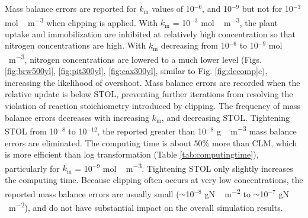 \documentclass[gmd, manuscript]{copernicus}
\begin{document}
Mass balance errors are reported for $k_\text{m}$ values of 10$^{-6}$, and
10$^{-9}$ but not for 10$^{-3}$ \unit{mol\,m^{-3}} when clipping is applied.
With $k_\text{m}$ = 10$^{-3}$ \unit{mol\,m^{-3}}, the plant uptake and
immobilization are inhibited at relatively high concentration so that nitrogen
concentrations are high. With $k_\text{m}$ decreasing from 10$^{-6}$ to
10$^{-9}$ \unit{mol\,m^{-3}}, nitrogen concentrations are lowered to a much lower
level (Figs. \ref{fig:brw500yl}, \ref{fig:pit300yl}, \ref{fig:cax300yl},
similar to Fig. \ref{fig:decomp}c), increasing the likelihood of overshoot.
Mass balance errors are recorded when the relative update is below STOL,
preventing further iterations from resolving the violation of reaction
stoichiometry introduced by clipping. The frequency of mass balance errors
decreases with increasing $k_\text{m}$, and decreasing STOL. Tightening STOL
from 10$^{-8}$ to 10$^{-12}$, the reported greater than 10$^{-8}$
\unit{g\,m^{-3}} mass balance errors are eliminated. The computing time is
about 50\% more than CLM, which is more efficient than log transformation
(Table \ref{tab:computingtime}), particularly for $k_\text{m}$ = 10$^{-9}$
\unit{mol\,m^{-3}}. Tightening STOL only slightly increases the computing time. 
Because clipping often occurs at very low concentrations, the reported mass
balance errors are usually small ($\sim$10$^{-8}$  \unit{gN\,m^{-2}} to
$\sim$10$^{-7}$  \unit{gN\,m^{-2}}), and do not have substantial impact
on the overall simulation results. 
\end{document}
